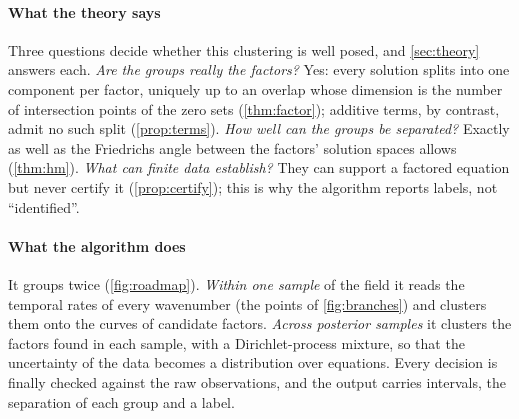 \documentclass[11pt]{article}
\theoremstyle{plain}
\theoremstyle{definition}
\theoremstyle{remark}
\begin{document}
\paragraph{What the theory says} Three questions decide whether this clustering is well posed, and
\cref{sec:theory} answers each. \emph{Are the groups really the factors?} Yes: every solution splits into one
component per factor, uniquely up to an overlap whose dimension is the number of intersection points of the zero sets
(\cref{thm:factor}); additive terms, by contrast, admit no such split (\cref{prop:terms}). \emph{How well can the
groups be separated?} Exactly as well as the Friedrichs angle between the factors' solution spaces allows
(\cref{thm:hm}). \emph{What can finite data establish?} They can support a factored equation but never certify it
(\cref{prop:certify}); this is why the algorithm reports labels, not ``identified''.

\paragraph{What the algorithm does} It groups twice (\cref{fig:roadmap}). \emph{Within one sample} of the field it
reads the temporal rates of every wavenumber (the points of \cref{fig:branches}) and clusters them onto the curves of
candidate factors. \emph{Across posterior samples} it clusters the factors found in each sample, with a Dirichlet-process
mixture, so that the uncertainty of the data becomes a distribution over equations. Every decision is finally checked
against the raw observations, and the output carries intervals, the separation of each group and a label.
\end{document}

